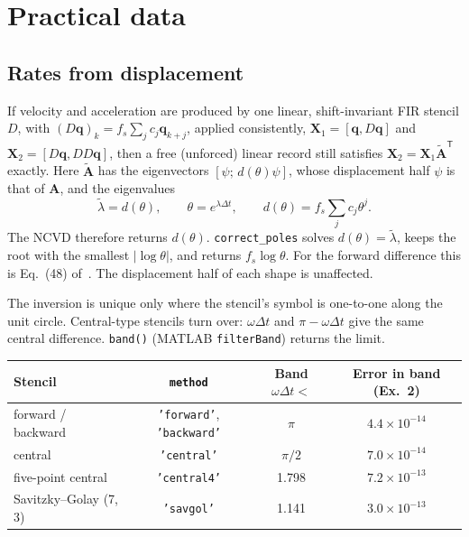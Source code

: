 \documentclass[report]{nld}
\theoremstyle{remark}\newtheorem*{remark}{Remark}
\newcommand{\X}{\mathbf{X}}
\newcommand{\code}[1]{\texttt{#1}}
\begin{document}
\section{Practical data}\label{sec:practical}

\subsection{Rates from displacement}\label{sec:fir}

If velocity and acceleration are produced by one linear, shift-invariant FIR
stencil $D$, with $(D\mathbf{q})_k=f_s\sum_j c_j\mathbf{q}_{k+j}$, applied
consistently,
$\X_1=[\mathbf{q},D\mathbf{q}]$ and $\X_2=[D\mathbf{q},DD\mathbf{q}]$, then a free (unforced)
linear record still satisfies $\X_2=\X_1\tilde{\mathbf{A}}^{\mathsf T}$ exactly. Here
$\tilde{\mathbf{A}}$ has the eigenvectors $[\psi;\,d(\theta)\psi]$, whose
displacement half $\psi$ is that of $\mathbf{A}$, and the eigenvalues
\begin{equation}
  \tilde\lambda=d(\theta),\qquad \theta=e^{\lambda\Delta t},\qquad d(\theta)=f_s\sum_j c_j\theta^{j}.
\end{equation}
The NCVD therefore returns $d(\theta)$. \code{correct\_poles} solves
$d(\theta)=\tilde\lambda$, keeps the root with the smallest $|\log\theta|$, and
returns $f_s\log\theta$. For the forward difference this is Eq.~(48)
of~\cite{li2025}. The displacement half of each shape is unaffected.

The inversion is unique only where the stencil's symbol is one-to-one along
the unit circle. Central-type stencils turn over: $\omega\Delta t$ and
$\pi-\omega\Delta t$ give the same central difference. \code{band()}
(MATLAB \code{filterBand}) returns the limit.

\begin{center}\footnotesize\setlength{\tabcolsep}{4pt}
\begin{tabular}{@{}lccc@{}}
\toprule
Stencil & \code{method} & Band $\omega\Delta t<$ & Error in band (Ex.~2)\\
\midrule
forward / backward & \code{'forward'}, \code{'backward'} & $\pi$ & $4.4\times10^{-14}$\\
central & \code{'central'} & $\pi/2$ & $7.0\times10^{-14}$\\
five-point central & \code{'central4'} & 1.798 & $7.2\times10^{-13}$\\
Savitzky--Golay (7, 3)~\cite{savitzky1964} & \code{'savgol'} & 1.141 & $3.0\times10^{-13}$\\
\bottomrule
\end{tabular}
\end{center}
\end{document}
